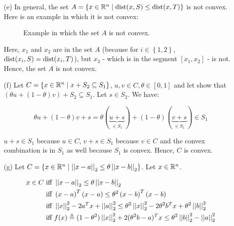 \documentclass[a4paper, 11pt]{report}
\begin{document}
\begin{itemize}
    \item[(e)] In general, the set $A = \left\{ x \in \mathbb{R}^{n} \mid \operatorname{dist}(x, S) \leq \operatorname{dist}(x, T)\right\}$ is not convex. Here is an example in which it is not convex:
    
    \begin{figure*}[!h]
    \centering
    \caption{Example in which the set $A$ is not convex.}
    \end{figure*}
    
    Here, $x_{1}$ and $x_{2}$ are in the set $A$ (because for $i \in \left\{ 1, 2 \right\}$, $\operatorname{dist}(x_{i}, S) = \operatorname{dist}(x_{i}, T)$), but $x_{3}$ - which is in the segment $[x_{1}, x_{2}]$ - is not. Hence, the set $A$ is not convex.
    
    \item[(f)] Let $C = \left\{ x \in \mathbb{R}^{n} \mid  x + S_{2} \subseteq S_{1}\right\}$, $u, v \in C, \theta \in [0, 1]$  and let show that $\left( \theta u + (1 - \theta) v \right) + S_{2} \subseteq S_{1}$. Let $s \in S_{2}$. We have:
    
    \[ \theta u + (1 - \theta) v + s = \theta(\underbrace{u + s}_{\in S_{1}}) + (1 - \theta)(\underbrace{v + s}_{\in S_{1}}) \in S_{1} \]
    
    $u + s \in S_{1}$ because $u \in C$, $v + s \in S_{1}$ because $v \in C$ and the convex combination is in $S_{1}$ as well because $S_{1}$ is convex. Hence, $C$ is convex.
    
    \item[(g)] Let $C = \left\{ x \in \mathbb{R}^{n} \mid \left|\left| x - a \right|\right|_{2} \leq \theta \left|\left| x - b \right|\right|_{2}\right\}$. Let $x \in \mathbb{R}^{n}$.
    
    \begin{equation*}
        \begin{split}
            x \in C &\text{ iff } \left|\left| x - a \right|\right|_{2} \leq \theta \left|\left| x - b \right|\right|_{2} \\
            &\text{ iff } \left( x - a \right)^{T} \left( x - a \right) \leq \theta^{2} \left( x - b \right)^{T} \left( x - b \right) \\
            &\text{ iff } \left|\left| x \right|\right|_{2}^{2} - 2a^{T}x + \left|\left| a \right|\right|_{2}^{2} \leq \theta^{2} \left|\left| x \right|\right|_{2}^{2} - 2 \theta^{2}b^{T}x + \theta^{2}\left|\left| b \right|\right|_{2}^{2} \\
            &\text{ iff } f(x) \triangleq (1 - \theta^{2}) \left|\left| x \right|\right|_{2}^{2} + 2(\theta^{2}b - a)^{T}x \leq \theta^{2} \left|\left| b \right|\right|_{2}^{2} - \left|\left| a \right|\right|_{2}^{2}
        \end{split}
    \end{equation*}
    

\end{itemize}
\end{document}
